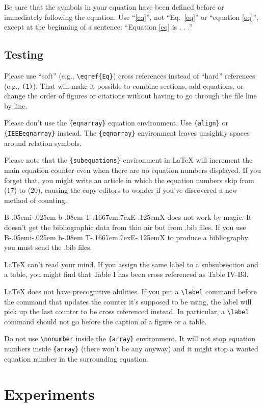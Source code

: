 \documentclass[conference]{IEEEtran}
\def\BibTeX{{\rm B\kern-.05em{\sc i\kern-.025em b}\kern-.08em
    T\kern-.1667em\lower.7ex\hbox{E}\kern-.125emX}}
\begin{document}
Be sure that the 
symbols in your equation have been defined before or immediately following 
the equation. Use ``\eqref{eq}'', not ``Eq.~\eqref{eq}'' or ``equation \eqref{eq}'', except at 
the beginning of a sentence: ``Equation \eqref{eq} is . . .''

\subsection{Testing}

Please use ``soft'' (e.g., \verb|\eqref{Eq}|) cross references instead
of ``hard'' references (e.g., \verb|(1)|). That will make it possible
to combine sections, add equations, or change the order of figures or
citations without having to go through the file line by line.

Please don't use the \verb|{eqnarray}| equation environment. Use
\verb|{align}| or \verb|{IEEEeqnarray}| instead. The \verb|{eqnarray}|
environment leaves unsightly spaces around relation symbols.

Please note that the \verb|{subequations}| environment in {\LaTeX}
will increment the main equation counter even when there are no
equation numbers displayed. If you forget that, you might write an
article in which the equation numbers skip from (17) to (20), causing
the copy editors to wonder if you've discovered a new method of
counting.

{\BibTeX} does not work by magic. It doesn't get the bibliographic
data from thin air but from .bib files. If you use {\BibTeX} to produce a
bibliography you must send the .bib files. 

{\LaTeX} can't read your mind. If you assign the same label to a
subsubsection and a table, you might find that Table I has been cross
referenced as Table IV-B3. 

{\LaTeX} does not have precognitive abilities. If you put a
\verb|\label| command before the command that updates the counter it's
supposed to be using, the label will pick up the last counter to be
cross referenced instead. In particular, a \verb|\label| command
should not go before the caption of a figure or a table.

Do not use \verb|\nonumber| inside the \verb|{array}| environment. It
will not stop equation numbers inside \verb|{array}| (there won't be
any anyway) and it might stop a wanted equation number in the
surrounding equation.

\section{Experiments}
\end{document}
